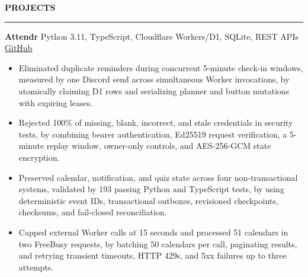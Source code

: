 \documentclass[10pt,letterpaper]{article}
\begin{document}
{\large\bfseries PROJECTS}\par
\vspace{2pt}\color{rulegray}\hrule\color{black}
\vspace{7pt}

{\bfseries Attendr} \textbar{} Python 3.11, TypeScript, Cloudflare Workers/D1, SQLite, REST APIs \textbar{}
\href{https://github.com/eliseomarinezuni/attendr}{\underline{GitHub}}

\begin{itemize}[label={-},leftmargin=0.18in,itemsep=3pt,topsep=4pt,parsep=0pt,partopsep=0pt]
  \item Eliminated duplicate reminders during concurrent 5-minute check-in windows, measured by one Discord send across simultaneous Worker invocations, by atomically claiming D1 rows and serializing planner and button mutations with expiring leases.
  \item Rejected 100\% of missing, blank, incorrect, and stale credentials in security tests, by combining bearer authentication, Ed25519 request verification, a 5-minute replay window, owner-only controls, and AES-256-GCM state encryption.
  \item Preserved calendar, notification, and quiz state across four non-transactional systems, validated by 193 passing Python and TypeScript tests, by using deterministic event IDs, transactional outboxes, revisioned checkpoints, checksums, and fail-closed reconciliation.
  \item Capped external Worker calls at 15 seconds and processed 51 calendars in two FreeBusy requests, by batching 50 calendars per call, paginating results, and retrying transient timeouts, HTTP 429s, and 5xx failures up to three attempts.
\end{itemize}
\end{document}
